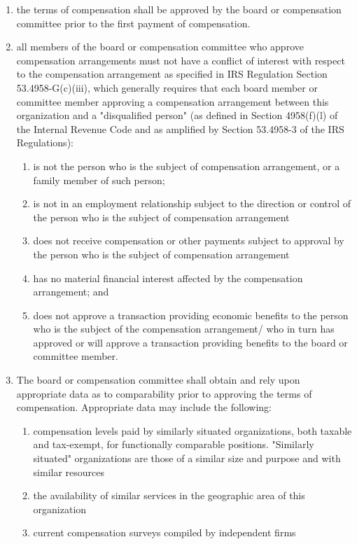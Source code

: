 \documentclass{article}
\begin{document}
	\begin{enumerate}[\indent (a)] 
		\item the terms of compensation shall be approved by the board or compensation committee prior to the first payment of compensation.
		\item all members of the board or compensation committee who approve compensation arrangements must not have a conflict of interest with respect to the compensation arrangement as specified in IRS Regulation Section 53.4958-G(c)(iii), which generally requires that each board member or committee member approving a compensation arrangement between this organization and a "disqualified person" (as defined in Section 4958(f)(l) of the Internal Revenue Code and as amplified by Section 53.4958-3 of the IRS Regulations):
		\begin{enumerate}[\indent 1)] 
			\item is not the person who is the subject of compensation arrangement, or a family member of such person;
			\item is not in an employment relationship subject to the direction or control of the person who is the subject of compensation arrangement
			\item does not receive compensation or other payments subject to approval by the person who is the subject of compensation arrangement
			\item has no material financial interest affected by the compensation arrangement; and
			\item does not approve a transaction providing economic benefits to the person who is the subject of the compensation arrangement/ who in turn has approved or will approve a transaction providing benefits to the board or committee member.
		\end{enumerate}
		\item The board or compensation committee shall obtain and rely upon appropriate data as to comparability prior to approving the terms of compensation. Appropriate data may include the following:
		\begin{enumerate}[\indent 1)] 
			\item compensation levels paid by similarly situated organizations, both taxable and tax-exempt, for functionally comparable positions. "Similarly situated" organizations are those of a similar size and purpose and with similar resources
			\item the availability of similar services in the geographic area of this organization
			\item current compensation surveys compiled by independent firms

\end{enumerate}
\end{enumerate}
\end{document}
